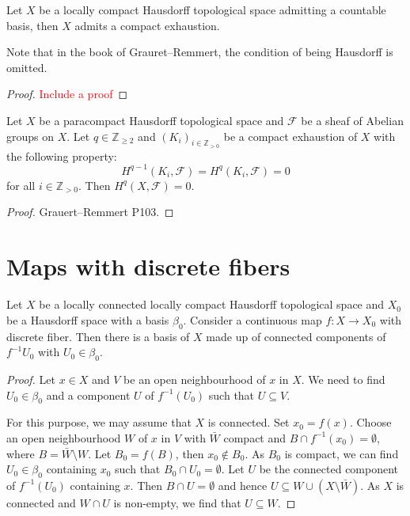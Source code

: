 \begin{proposition}
    Let $X$ be a locally compact Hausdorff topological space admitting a countable basis, then $X$ admits a compact exhaustion.
\end{proposition}
Note that in the book of Grauret--Remmert, the condition of being Hausdorff is omitted.
\begin{proof}
    \textcolor{red}{Include a proof}
\end{proof}

\begin{lemma}\label{lma-exhaustioncoh}
    Let $X$ be a paracompact Hausdorff topological space and $\mathcal{F}$ be a sheaf of Abelian groups on $X$. Let $q\in \mathbb{Z}_{\geq 2}$ and $(K_i)_{i\in \mathbb{Z}_{>0}}$ be a compact exhaustion of $X$ with the following property:
    \[
        H^{q-1}(K_i,\mathcal{F})=H^q(K_i,\mathcal{F})=0  
    \]
    for all $i\in \mathbb{Z}_{>0}$. Then $H^q(X,\mathcal{F})=0$.
\end{lemma}
\begin{proof}
    Grauert--Remmert P103.
\end{proof}

\section{Maps with discrete fibers}

\begin{lemma}\label{lma-connectedcompofiberdim0basis}
    Let $X$ be a locally connected locally compact Hausdorff topological space and $X_0$ be a Hausdorff space with a basis $\beta_0$. Consider a continuous map $f:X\rightarrow X_0$ with discrete fiber. Then there is a basis of $X$ made up of connected components of $f^{-1}U_0$ with $U_0\in \beta_0$.
\end{lemma}
\begin{proof}
    Let $x\in X$ and $V$ be an open neighbourhood of $x$ in $X$. We need to find $U_0\in \beta_0$ and a component $U$ of $f^{-1}(U_0)$ such that $U\subseteq V$.
    
    For this purpose, we may assume that $X$ is connected. Set $x_0=f(x)$.
    Choose an open neighbourhood $W$ of $x$ in $V$ with $\bar{W}$ compact and $B\cap f^{-1}(x_0)=\emptyset$, where $B=\bar{W}\setminus W$. Let $B_0=f(B)$, then $x_0\not\in B_0$. As $B_0$ is compact, we can find $U_0\in \beta_0$ containing $x_0$ such that $B_0\cap U_0=\emptyset$. Let $U$ be the connected component of $f^{-1}(U_0)$ containing $x$. Then $B\cap U=\emptyset$ and hence $U\subseteq W\cup (X\setminus \bar{W})$. As $X$ is connected and $W\cap U$ is non-empty, we find that $U\subseteq W$.
\end{proof}

